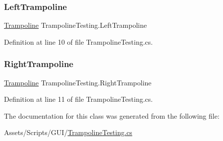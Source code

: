 \subsubsection{\texorpdfstring{Left\+Trampoline}{LeftTrampoline}}
{\footnotesize\ttfamily \mbox{\hyperlink{class_trampoline}{Trampoline}} Trampoline\+Testing.\+Left\+Trampoline}



Definition at line 10 of file Trampoline\+Testing.\+cs.

\mbox{\label{class_trampoline_testing_a1082a1951b239ad4143796a3ac0130c3}} 
\subsubsection{\texorpdfstring{Right\+Trampoline}{RightTrampoline}}
{\footnotesize\ttfamily \mbox{\hyperlink{class_trampoline}{Trampoline}} Trampoline\+Testing.\+Right\+Trampoline}



Definition at line 11 of file Trampoline\+Testing.\+cs.



The documentation for this class was generated from the following file\+:\begin{DoxyCompactItemize}
\item 
Assets/\+Scripts/\+G\+U\+I/\mbox{\hyperlink{_trampoline_testing_8cs}{Trampoline\+Testing.\+cs}}\end{DoxyCompactItemize}
